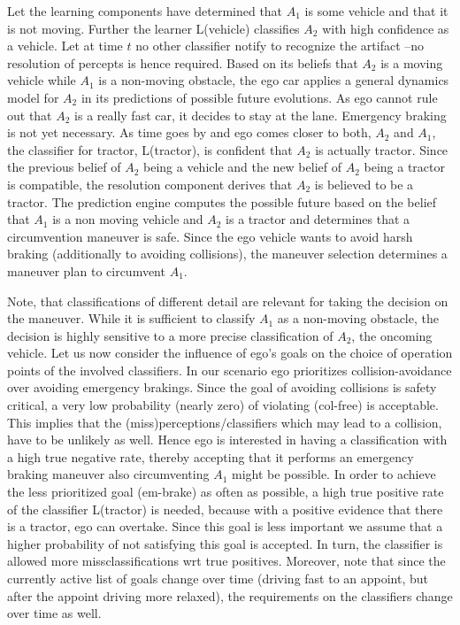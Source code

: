 Let the learning components have determined
 that $A_1$ is some vehicle and that it is not moving. 
Further the learner L(vehicle) classifies $A_2$  with high confidence as a vehicle. Let at time $t$ no other classifier notify to recognize the artifact --no resolution of percepts is hence required. Based on its beliefs that $A_2$ is a moving vehicle while $A_1$ is a non-moving obstacle, the ego car applies a general dynamics model for $A_2$ in its predictions of possible future evolutions. As ego cannot rule out that $A_2$ is a really fast car, it decides to stay at the lane. Emergency braking is not yet necessary. As time goes by and ego comes closer to both, $A_2$ and $A_1$, the classifier for tractor, L(tractor), is confident that  $A_2$ is actually tractor.
Since the previous belief of $A_2$ being a vehicle and the new belief of $A_2$ being a tractor is compatible, the resolution component derives that $A_2$ is believed to be a tractor. The prediction engine computes the possible future based on the belief that $A_1$ is a  non moving vehicle and $A_2$ is a tractor and determines that a circumvention maneuver is safe. Since the ego vehicle wants to avoid harsh braking (additionally to avoiding collisions), the maneuver selection determines a maneuver plan to circumvent $A_1$.

Note, that classifications of different detail are relevant for taking the decision on the maneuver. While it is sufficient to classify $A_1$ as a non-moving obstacle, the decision is highly sensitive to a more precise classification of $A_2$, the oncoming vehicle.
%
Let us now consider the influence of ego's goals on the choice of operation points of the involved classifiers. In our scenario ego prioritizes collision-avoidance over avoiding emergency brakings. Since the goal of avoiding collisions is safety critical, a very low probability (nearly zero) of violating (col-free) is acceptable. 
This implies that the (miss)perceptions/classifiers which may lead to a collision, have to be unlikely as well. Hence ego is interested in having a classification with a high true negative rate, thereby accepting that it performs an emergency braking maneuver also circumventing $A_1$ might be possible.
In order to achieve the less prioritized goal (em-brake) as often as possible, a high true positive rate of the classifier  L(tractor) is needed, because with a positive evidence that there is a tractor, ego can overtake. Since this goal is less important we assume that a higher probability of not satisfying this goal is accepted. In turn, the classifier is allowed more missclassifications wrt true positives.  
%
Moreover, note that since the currently active list of goals change over time (driving fast to an appoint, but after the appoint driving more relaxed), the requirements on the classifiers change over time as well.  

